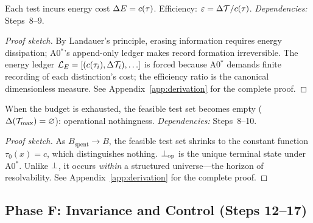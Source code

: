 \begin{theorem}
\label{thm:energy}
Each test incurs energy cost $\Delta E = c(\tau)$.  Efficiency: $\varepsilon = \Delta\mathcal{T} / c(\tau)$.
\emph{Dependencies:} Steps~8--9.
\begin{proof}[Proof sketch]
By Landauer's principle, erasing information requires energy dissipation; A0$^*$'s append-only ledger makes record formation irreversible.  The energy ledger $\mathcal{L}_E = [(c(\tau_i), \Delta\mathcal{T}_i), \ldots]$ is forced because A0$^*$ demands finite recording of each distinction's cost; the efficiency ratio is the canonical dimensionless measure.
See Appendix~\ref{app:derivation} for the complete proof.
\end{proof}
\end{theorem}

\begin{theorem}
\label{thm:opnoth}
When the budget is exhausted, the feasible test set becomes empty ($\Delta(\mathcal{T}_{\max}) = \varnothing$): operational nothingness.
\emph{Dependencies:} Steps~8--10.
\begin{proof}[Proof sketch]
As $B_{\mathrm{spent}} \to B$, the feasible test set shrinks to the constant function $\tau_0(x) = c$, which distinguishes nothing.  $\bot_{\mathrm{op}}$ is the unique terminal state under A0$^*$.  Unlike $\bot$, it occurs \emph{within} a structured universe---the horizon of resolvability.
See Appendix~\ref{app:derivation} for the complete proof.
\end{proof}
\end{theorem}

\subsection{Phase F: Invariance and Control (Steps 12--17)}
\label{sec:derivation:invariance}

